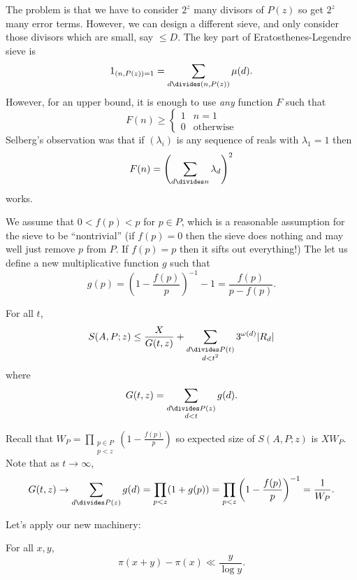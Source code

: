 \documentclass[a4paper]{article}
\begin{document}
The problem is that we have to consider \(2^z\) many divisors of \(P(z)\) so get \(2^z\) many error terms. However, we can design a different sieve, and only consider those divisors which are small, say \(\leq D\). The key part of Eratosthenes-Legendre sieve is
\[
  1_{(n, P(z)) = 1} = \sum_{d \divides (n, P(z))} \mu(d).
\]
However, for an upper bound, it is enough to use \emph{any} function \(F\) such that
\[
  F(n) \geq
  \begin{cases}
    1 & n = 1 \\
    0 & \text{otherwise}
  \end{cases}
\]
Selberg's observation was that if \((\lambda_i)\) is any sequence of reals with \(\lambda_1 = 1\) then
\[
  F(n) = \left( \sum_{d \divides n} \lambda_d \right)^2
\]
works.

We assume that \(0 < f(p) < p\) for \(p \in P\), which is a reasonable assumption for the sieve to be ``nontrivial'' (if \(f(p) = 0\) then the sieve does nothing and may well just remove \(p\) from \(P\). If \(f(p) = p\) then it sifts out everything!) The let us define a new multiplicative function \(g\) such that
\[
  g(p) = \left( 1 - \frac{f(p)}{p} \right)^{-1} - 1 = \frac{f(p)}{p - f(p)}.
\]

\begin{theorem}
  \label{thm:Selberg's sieve}
  For all \(t\),
  \[
    S(A, P; z) \leq \frac{X}{G(t, z)} + \sum_{\substack{d \divides P(t) \\ d < t^2}} 3^{\omega(d)} |R_d|
  \]
  where
  \[
    G(t, z) = \sum_{\substack{d \divides P(z) \\ d < t}} g(d).
  \]
\end{theorem}

Recall that \(W_P = \prod_{\substack{p \in P \\ p < z}} (1 - \frac{f(p)}{p})\) so expected size of \(S(A, P; z)\) is \(XW_P\). Note that as \(t \to \infty\),
\[
  G(t, z)
  \to \sum_{d \divides P(z)} g(d) 
  = \prod_{p < z} (1 + g(p))
  = \prod_{p < z} \left( 1 - \frac{f(p)}{p} \right)^{-1}
  = \frac{1}{W_P}.
\]

Let's apply our new machinery:
\begin{corollary}
  For all \(x, y\),
  \[
    \pi(x + y) - \pi(x) \ll \frac{y}{\log y}.
  \]
\end{corollary}
\end{document}
